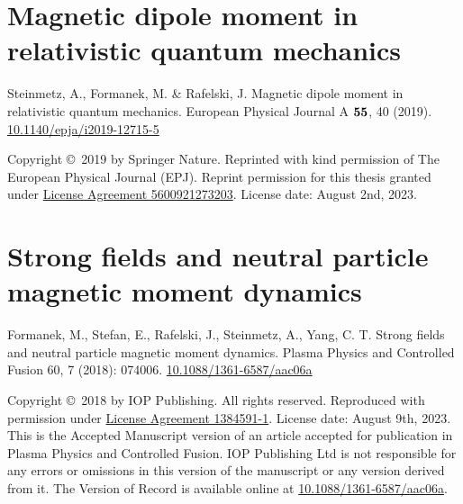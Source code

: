 \chapter{Magnetic dipole moment in relativistic quantum mechanics}
\label{appendixA}
\begin{center}
Steinmetz, A., Formanek, M. \& Rafelski, J. Magnetic dipole moment in relativistic quantum mechanics. European Physical Journal A $\boldsymbol{55}$, 40 (2019). \href{https://doi.org/10.1140/epja/i2019-12715-5}{10.1140/epja/i2019-12715-5}
\end{center}

\noindent Copyright \copyright\ 2019 by Springer Nature. Reprinted with kind permission of The European Physical Journal (EPJ). Reprint permission for this thesis granted under \href{https://s100.copyright.com/CustomerAdmin/PLF.jsp?ref=9a7a42d0-4511-4427-8acd-73a16083772c}{License Agreement 5600921273203}. License date: August 2nd, 2023.

%

\chapter{Strong fields and neutral particle magnetic moment dynamics}
\label{appendixB}
\begin{center}
Formanek, M., Stefan, E., Rafelski, J., Steinmetz, A., Yang, C. T. Strong fields and neutral particle magnetic moment dynamics. Plasma Physics and Controlled Fusion 60, 7 (2018): 074006. \href{https://doi.org/10.1088/1361-6587/aac06a}{10.1088/1361-6587/aac06a}
\end{center}

\noindent Copyright \copyright\ 2018 by IOP Publishing. All rights reserved. Reproduced with permission under \href{https://marketplace.copyright.com/rs-ui-web/mp/license/56222509-d3e0-45fd-8ba6-f519e90d4d18/3a89c359-de4e-466f-93c3-ef1135413aab}{License Agreement 1384591-1}. License date: August 9th, 2023. This is the Accepted Manuscript version of an article accepted for publication in Plasma Physics and Controlled Fusion. IOP Publishing Ltd is not responsible for any errors or omissions in this version of the manuscript or any version derived from it. The Version of Record is available online at \href{https://doi.org/10.1088/1361-6587/aac06a}{10.1088/1361-6587/aac06a}.

